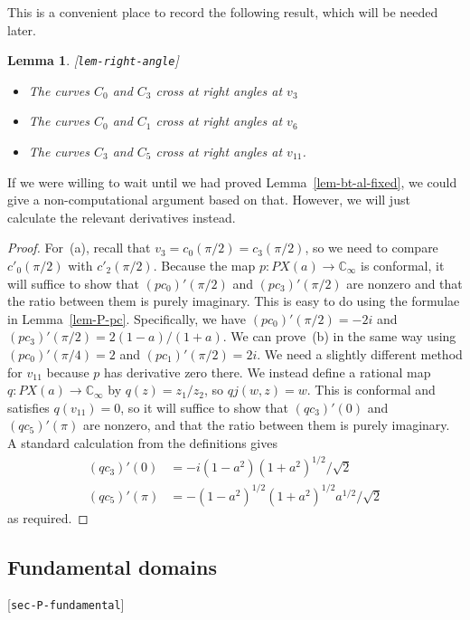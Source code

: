 \documentclass[reqno]{amsart}
\newcommand{\lbl}[1]{\label{#1}\textup{[\texttt{#1}]}\par}
\newcommand{\lbl}{\label}
\newcommand{\C}         {{\mathbb{C}}}
\newcommand{\rt}        {\sqrt{2}}
\renewcommand{\:}{\colon}
\newtheorem{lemma}[theorem]{Lemma}
\theoremstyle{definition}
\begin{document}
This is a convenient place to record the following result, which will
be needed later.
\begin{lemma}\lbl{lem-right-angle}
 \begin{itemize}
  \item[(a)] The curves $C_0$ and $C_3$ cross at right angles at $v_3$
  \item[(b)] The curves $C_0$ and $C_1$ cross at right angles at $v_6$
  \item[(c)] The curves $C_3$ and $C_5$ cross at right angles at $v_{11}$.
 \end{itemize}
\end{lemma}
If we were willing to wait until we had proved
Lemma~\ref{lem-bt-al-fixed}, we could give a non-computational
argument based on that.  However, we will just calculate the relevant
derivatives instead.
\begin{proof}
 For~(a), recall that $v_3=c_0(\pi/2)=c_3(\pi/2)$, so we need to
 compare $c'_0(\pi/2)$ with $c'_2(\pi/2)$.  Because the map
 $p\:PX(a)\to\C_\infty$ is conformal, it will suffice to show that
 $(pc_0)'(\pi/2)$ and $(pc_3)'(\pi/2)$ are nonzero and that the ratio
 between them is purely imaginary.  This is easy to do using the
 formulae in Lemma~\ref{lem-P-pc}.  Specifically, we have
 $(pc_0)'(\pi/2)=-2i$ and $(pc_3)'(\pi/2)=2(1-a)/(1+a)$.  We can
 prove~(b) in the same way using $(pc_0)'(\pi/4)=2$ and
 $(pc_1)'(\pi/2)=2i$.  We need a slightly different method for
 $v_{11}$ because $p$ has derivative zero there.  We instead define a
 rational map $q\:PX(a)\to\C_\infty$ by $q(z)=z_1/z_2$, so
 $qj(w,z)=w$.  This is conformal and satisfies $q(v_{11})=0$, so it
 will suffice to show that $(qc_3)'(0)$ and $(qc_5)'(\pi)$ are
 nonzero, and that the ratio between them is purely imaginary.  A
 standard calculation from the definitions gives
 \begin{align*}
  (qc_3)'(0) &= -i(1-a^2)(1+a^2)^{1/2}/\rt \\
  (qc_5)'(\pi) &= -(1-a^2)^{1/2}(1+a^2)^{1/2}a^{1/2}/\rt
 \end{align*}
 as required.
\end{proof}

\subsection{Fundamental domains}
\lbl{sec-P-fundamental}
\end{document}
